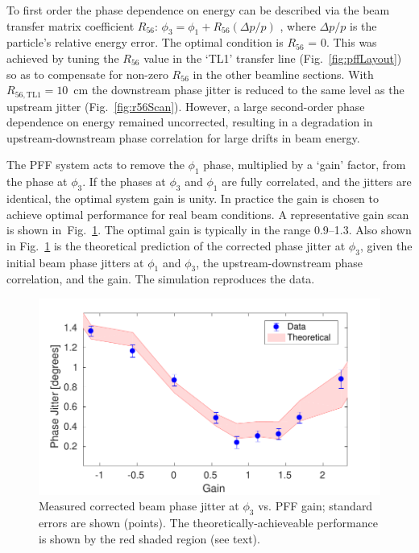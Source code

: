 \documentclass[%
 reprint,
 superscriptaddress,
 amsmath,
 amssymb,
 prl,
]{revtex4-1}
\begin{document}
To first order the phase dependence on energy can be described via the beam 
transfer matrix coefficient 
\(R_{56}\): \(\phi_3 = \phi_1 + R_{56}(\Delta p / p)\)
, where \(\Delta p / p\) is the particle's relative energy error.
The optimal condition is \(R_{56}\) = 0.
This was achieved by tuning the \(R_{56}\) value in the `TL1' transfer line 
(Fig.~\ref{fig:pffLayout}) so as to compensate for non-zero \(R_{56}\) in the 
other beamline sections. With \(R_{56, \mathrm{TL1}}=10\)~cm the 
downstream phase jitter is reduced to the same level as the upstream jitter 
(Fig.~\ref{fig:r56Scan}). 
However, a large second-order phase dependence on energy remained uncorrected, 
resulting in a degradation in upstream-downstream phase correlation for large 
drifts in beam energy.

The PFF system acts to remove the \(\phi_1\) phase, multiplied by a `gain' 
factor, from the phase at \(\phi_3\). If the phases at \(\phi_3\) and 
\(\phi_1\) are fully correlated, and the jitters are identical, the optimal 
system gain is unity.
In practice the gain is chosen to achieve optimal 
performance for real beam conditions. A representative gain scan is shown 
in~Fig.~\ref{fig:gScan}. The optimal gain is typically in the range 
0.9--1.3. Also shown in Fig.~\ref{fig:gScan} is the theoretical prediction of 
the corrected phase jitter at \(\phi_3\), given the initial beam phase jitters 
at \(\phi_1\) and 
\(\phi_3\), the upstream-downstream phase correlation, and the gain. The 
simulation reproduces the data.

\begin{figure}
\includegraphics[width=\columnwidth]{figs/gScan}
\caption{\label{fig:gScan}Measured corrected beam  phase jitter at \(\phi_3\) 
vs. PFF gain; standard errors are shown (points). The theoretically-achieveable 
performance is shown by the red shaded region (see text).}
\end{figure}
\end{document}
